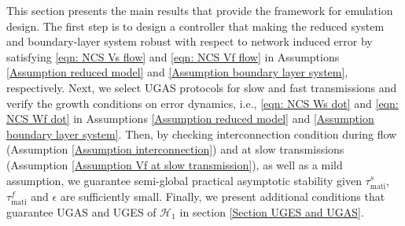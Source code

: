 
This section presents the main results that provide the framework for emulation design. The first step is to design a controller that making the reduced system and boundary-layer system robust with respect to network induced error by satisfying \eqref{eqn: NCS Vs flow} and \eqref{eqn: NCS Vf flow} in Assumptions \ref{Assumption reduced model} and \ref{Assumption boundary layer system}, respectively. Next, we select UGAS protocols for slow and fast transmissions and verify the growth conditions on error dynamics, i.e., \eqref{eqn: NCS Ws dot} and \eqref{eqn: NCS Wf dot} in Assumptions \ref{Assumption reduced model} and \ref{Assumption boundary layer system}. Then, by checking interconnection condition during flow (Assumption \ref{Assumption interconnection}) and at slow transmissions (Assumption \ref{Assumption Vf at slow transmission}), as well as a mild assumption, we guarantee semi-global practical asymptotic stability given $\tau_{\text{mati}}^s$, $\tau_{\text{mati}}^f$ and $\epsilon$ are sufficiently small.
Finally, we present additional conditions that guarantee UGAS and UGES of $\mathcal{H}_1$ in section \ref{Section UGES and UGAS}.




%
%
